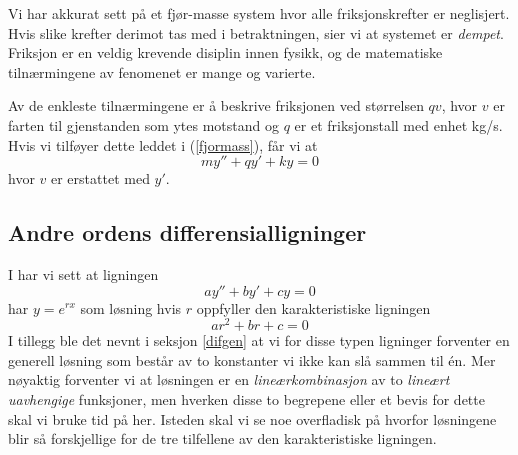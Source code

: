 Vi har akkurat sett på et fjør-masse system hvor alle friksjonskrefter er neglisjert. Hvis slike krefter derimot tas med i betraktningen, sier vi at systemet er \textit{dempet}. Friksjon er en veldig krevende disiplin innen fysikk, og de matematiske tilnærmingene av fenomenet er mange og varierte. \vsk

Av de enkleste tilnærmingene er å beskrive friksjonen ved størrelsen $ qv $, hvor $ v $ er farten til gjenstanden som ytes motstand og $ q $ er et friksjonstall med enhet kg/s. Hvis vi tilføyer dette leddet i (\ref{fjormass}), får vi at
\[ my'' + qy'+ky = 0 \]
hvor $ v $ er erstattet med $ y' $.\regv
\fjmasd
\newpage
{}
\newpage
{}
\subsection*{Andre ordens differensialligninger}
I  har vi sett at ligningen
\begin{equation}
ay''+by'+cy = 0 \label{sodeforkl}
\end{equation}
har ${y= e^{rx}} $ som løsning hvis $ r $ oppfyller den karakteristiske ligningen
\begin{equation}
ar^2 + br + c = 0 \label{kar}
\end{equation}
I tillegg ble det nevnt i seksjon \ref{difgen} at vi for disse typen ligninger forventer en generell løsning som består av to konstanter vi ikke kan slå sammen til én. Mer nøyaktig forventer vi at løsningen er en \textit{lineærkombinasjon} av to \textit{lineært uavhengige} funksjoner, men hverken disse to begrepene eller et bevis for dette skal vi bruke tid på her. Isteden skal vi se noe overfladisk på hvorfor løsningene blir så forskjellige for de tre tilfellene av den karakteristiske ligningen. \vsk

